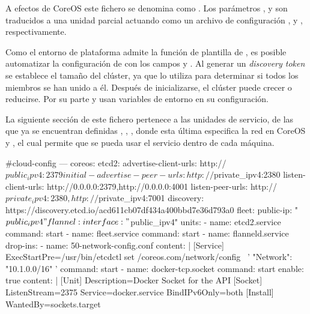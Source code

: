 A efectos de CoreOS este fichero se denomina como . Los parámetros ,  y  son traducidos a una unidad  parcial actuando como un archivo de configuración ,  y , respectivamente. 

Como el entorno de plataforma admite la función de plantilla de , es posible automatizar la configuración de  con los campos  y . Al generar un \textit{discovery token} se establece el tamaño del clúster, ya que  lo utiliza para determinar si todos los miembros se han unido a él. Después de inicializarse, el clúster puede crecer o reducirse. Por su parte  y  usan variables de entorno en su configuración.

La siguiente sección de este fichero pertenece a las unidades de servicio, de las que ya se encuentran definidas , , , donde esta última especifica la red en CoreOS y , el cual permite que se pueda usar el servicio  dentro de cada máquina.

\begin{codelisting}
\label{code:cloud-config1}
\begin{code}
#cloud-config
---
coreos:
  etcd2:
    advertise-client-urls: http://$public_ipv4:2379
    initial-advertise-peer-urls: http://$private_ipv4:2380
    listen-client-urls: http://0.0.0.0:2379,http://0.0.0.0:4001
    listen-peer-urls: http://$private_ipv4:2380,http://$private_ipv4:7001
    discovery: https://discovery.etcd.io/acd611cb07df434a400bbd7e36d793a0
  fleet:
    public-ip: "$public_ipv4"
  flannel:
    interface: "$public_ipv4"
  units:
  - name: etcd2.service
    command: start
  - name: fleet.service
    command: start
  - name: flanneld.service
    drop-ins:
    - name: 50-network-config.conf
      content: |
        [Service]
        ExecStartPre=/usr/bin/etcdctl set /coreos.com/network/config \
                     '{ "Network": "10.1.0.0/16" }'
    command: start
  - name: docker-tcp.socket
    command: start
    enable: true
    content: |
      [Unit]
      Description=Docker Socket for the API
      [Socket]
      ListenStream=2375
      Service=docker.service
      BindIPv6Only=both
      [Install]
      WantedBy=sockets.target
\end{code}
\end{codelisting}

